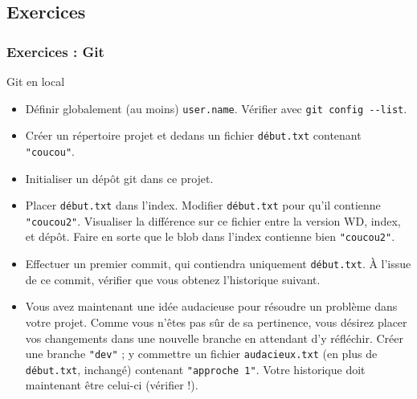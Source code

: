 \documentclass[english, french]{beamer}
\begin{document}
\subsection{Exercices}
\begin{frame}[allowframebreaks]
	\small
	\frametitle{Exercices : Git}
	Git en local
	\begin{itemize}
		\item Définir globalement (au moins) \texttt{user.name}. Vérifier avec \texttt{git config -{}-list}.
		\item Créer un répertoire projet et dedans un fichier \texttt{début.txt} contenant \texttt{"coucou"}.
		\item Initialiser un dépôt git dans ce projet.
		\item Placer \texttt{début.txt} dans l’index. Modifier \texttt{début.txt} pour qu’il contienne \texttt{"coucou2"}. Visualiser la différence sur ce fichier entre la version WD, index, et dépôt. Faire en sorte que le blob dans l’index contienne bien \texttt{"coucou2"}.
		\item Effectuer un premier commit, qui contiendra uniquement \texttt{début.txt}. À l’issue de ce commit, vérifier que vous obtenez l’historique suivant.\par
		{
			\centering
			\par
		}
		\item Vous avez maintenant une idée audacieuse pour résoudre un problème dans votre projet. Comme vous n’êtes pas sûr de sa pertinence, vous désirez placer vos changements dans une nouvelle branche en attendant d’y réfléchir. Créer une branche \texttt{"dev"} ; y commettre un fichier \texttt{audacieux.txt} (en plus de \texttt{début.txt}, inchangé) contenant \texttt{"approche 1"}. Votre historique doit maintenant être celui-ci (vérifier !).\par
		{
			\centering
			}
\end{itemize}
\end{frame}
\end{document}
